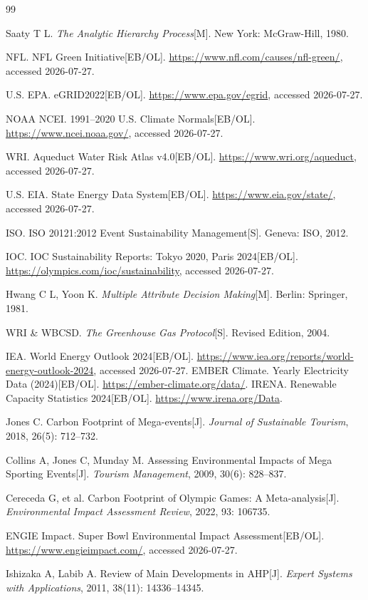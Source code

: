 \documentclass[12pt]{ctexart}
\begin{document}
\begin{thebibliography}{99}

Saaty T L. \textit{The Analytic Hierarchy Process}[M]. New York: McGraw-Hill, 1980.

NFL. NFL Green Initiative[EB/OL]. \url{https://www.nfl.com/causes/nfl-green/}, accessed 2026-07-27.

U.S. EPA. eGRID2022[EB/OL]. \url{https://www.epa.gov/egrid}, accessed 2026-07-27.

NOAA NCEI. 1991--2020 U.S. Climate Normals[EB/OL]. \url{https://www.ncei.noaa.gov/}, accessed 2026-07-27.

WRI. Aqueduct Water Risk Atlas v4.0[EB/OL]. \url{https://www.wri.org/aqueduct}, accessed 2026-07-27.

U.S. EIA. State Energy Data System[EB/OL]. \url{https://www.eia.gov/state/}, accessed 2026-07-27.

ISO. ISO 20121:2012 Event Sustainability Management[S]. Geneva: ISO, 2012.

IOC. IOC Sustainability Reports: Tokyo 2020, Paris 2024[EB/OL]. \url{https://olympics.com/ioc/sustainability}, accessed 2026-07-27.

Hwang C L, Yoon K. \textit{Multiple Attribute Decision Making}[M]. Berlin: Springer, 1981.

WRI \& WBCSD. \textit{The Greenhouse Gas Protocol}[S]. Revised Edition, 2004.

IEA. World Energy Outlook 2024[EB/OL]. \url{https://www.iea.org/reports/world-energy-outlook-2024}, accessed 2026-07-27.
EMBER Climate. Yearly Electricity Data (2024)[EB/OL]. \url{https://ember-climate.org/data/}.
IRENA. Renewable Capacity Statistics 2024[EB/OL]. \url{https://www.irena.org/Data}.

Jones C. Carbon Footprint of Mega-events[J]. \textit{Journal of Sustainable Tourism}, 2018, 26(5): 712--732.

Collins A, Jones C, Munday M. Assessing Environmental Impacts of Mega Sporting Events[J]. \textit{Tourism Management}, 2009, 30(6): 828--837.

Cereceda G, et al. Carbon Footprint of Olympic Games: A Meta-analysis[J]. \textit{Environmental Impact Assessment Review}, 2022, 93: 106735.

ENGIE Impact. Super Bowl Environmental Impact Assessment[EB/OL]. \url{https://www.engieimpact.com/}, accessed 2026-07-27.

Ishizaka A, Labib A. Review of Main Developments in AHP[J]. \textit{Expert Systems with Applications}, 2011, 38(11): 14336--14345.

\end{thebibliography}
\end{document}
